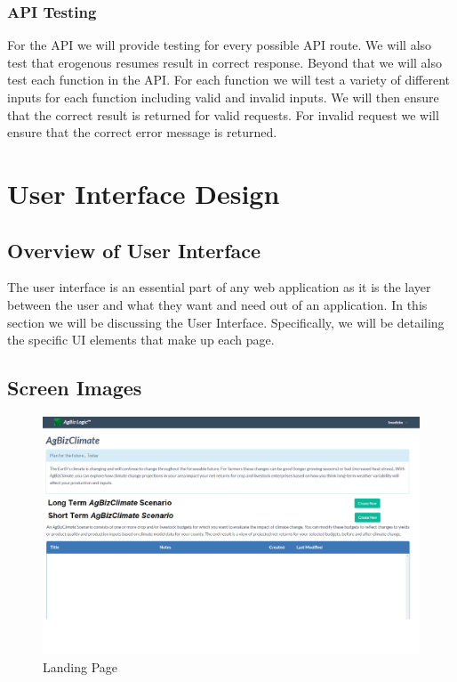 \documentclass[onecolumn, draftclsnofoot,10pt, compsoc]{article}
\begin{document}
		\subsubsection{API Testing}
		For the API we will provide testing for every possible API route. We will also test that erogenous resumes result in correct response. Beyond that we will also test each function in the API. For each function we will test a variety of different inputs for each function including valid and invalid inputs. We will then ensure that the correct result is returned for valid requests. For invalid request we will ensure that the correct error message is returned.\\

\section{User Interface Design}

	\subsection{Overview of User Interface}
	The user interface is an essential part of any web application as it is the layer between the user and what they want and need out of an application. In this section we will be discussing the User Interface. Specifically, we will be detailing the specific UI elements that make up each page.
	\subsection{Screen Images}
		\begin{figure}[htb]
		\includegraphics[width=\linewidth]{Figures/LandingPage.eps}
		\caption{Landing Page}
		\label{figure3.1}
	\end{figure}
					
\end{document}
